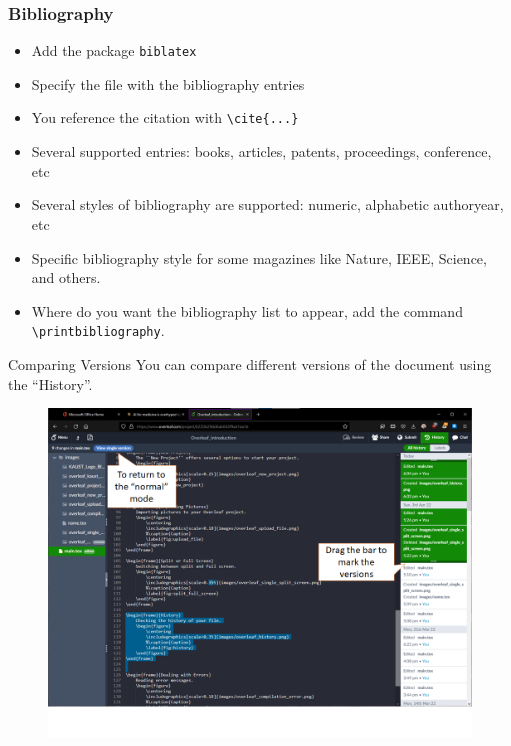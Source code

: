 \documentclass[aspectratio=169]{beamer}
\begin{document}
\begin{frame}[fragile]
\frametitle{Bibliography}

    \begin{itemize}
        \item Add the package \texttt{biblatex}
        \item Specify the file with the bibliography entries
        \item You reference the citation with \verb|\cite{...}|
        \item Several supported entries: books, articles, patents, proceedings, conference, etc
        \item Several styles of bibliography are supported: numeric, alphabetic authoryear, etc
        \item Specific bibliography style for some magazines like Nature, IEEE, Science, and others.
        \item Where do you want the bibliography list to appear, add the command \verb|\printbibliography|.        
    \end{itemize}
    
\end{frame}

\begin{frame}{Comparing Versions}
    You can compare different versions of the document using the ``History''.
    \begin{figure}
        \centering
        \includegraphics[scale=0.3]{images/overleaf_history_compare_2.png}
        \label{fig:history_compare}
    \end{figure}
\end{frame}
\end{document}
